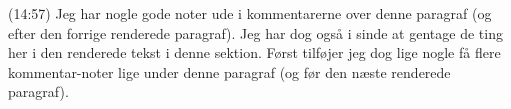 \documentclass{report}
\begin{document}

(14:57) Jeg har nogle gode noter ude i kommentarerne over denne paragraf (og efter den forrige renderede paragraf). Jeg har dog også i sinde at gentage de ting her i den renderede tekst i denne sektion. Først tilføjer jeg dog lige nogle få flere kommentar-noter lige under denne paragraf (og før den næste renderede paragraf). 

\end{document}
